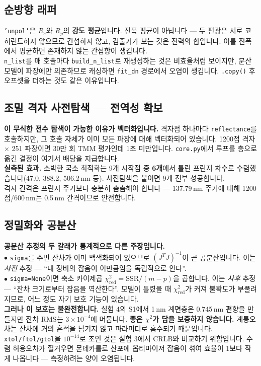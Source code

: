 \documentclass[10pt,a4paper]{article}
\newcommand{\note}[1]{%
  \begin{tcolorbox}[enhanced,breakable,colback=white,colframe=accent,
    boxrule=0pt,leftrule=1.6pt,arc=0pt,outer arc=0pt,
    left=6pt,right=2pt,top=3pt,bottom=3pt,boxsep=0pt,
    before skip=5pt, after skip=8pt]
  #1
  \end{tcolorbox}}
\begin{document}
\subsection{순방향 래퍼}

\note{
\texttt{'unpol'}은 $R_s$와 $R_p$의 \textbf{강도 평균}입니다. 진폭 평균이 아닙니다 —
두 편광은 서로 코히런트하지 않으므로 간섭하지 않고, 검출기가 보는 것은 전력의 합입니다.
이를 진폭에서 평균하면 존재하지 않는 간섭항이 생깁니다.\\[4pt]
\texttt{n\_list}를 매 호출마다 \texttt{build\_n\_list}로 재생성하는 것은 비효율처럼 보이지만,
분산 모델이 파장에만 의존하므로 캐싱하면 \texttt{fit\_dn} 경로에서 오염이 생깁니다.
\texttt{.copy()} 후 오프셋을 더하는 것도 같은 이유입니다.
}
\subsection{조밀 격자 사전탐색 — 전역성 확보}

\note{
\textbf{이 무식한 전수 탐색이 가능한 이유가 벡터화입니다.} 격자점 하나마다
\texttt{reflectance}를 호출하지만, 그 호출 자체가 이미 모든 파장에 대해 벡터화되어 있습니다.
1200점 격자 $\times$ 251 파장이면 30만 회 TMM 평가인데 1초 미만입니다.
\texttt{core.py}에서 루프를 층으로 옮긴 결정이 여기서 배당을 지급합니다.\\[4pt]
\textbf{실측된 효과.} 소박한 국소 최적화는 9개 시작점 중 \textbf{6개}에서 틀린 프린지
차수로 수렴했습니다(47.0, 388.2, 506.2\,nm 등). 사전탐색을 붙이면 9개 전부 성공합니다.\\[4pt]
격자 간격은 프린지 주기보다 충분히 촘촘해야 합니다 — 137.79\,nm 주기에 대해
1200점/600\,nm는 0.5\,nm 간격이므로 안전합니다.
}
\subsection{정밀화와 공분산}

\note{
\textbf{공분산 추정의 두 갈래가 통계적으로 다른 주장입니다.}\\[3pt]
$\bullet$ \texttt{sigma}를 주면 잔차가 이미 백색화되어 있으므로 $(J^TJ)^{-1}$이 곧
공분산입니다. 이는 \emph{사전} 추정 — ``내 장비의 잡음이 이만큼임을 독립적으로 안다''.\\[3pt]
$\bullet$ \texttt{sigma=None}이면 축소 카이제곱 $\chi^2_{\text{red}}=\text{SSR}/(m-p)$을
곱합니다. 이는 \emph{사후} 추정 — ``잔차 크기로부터 잡음을 역산한다''. 모델이 틀렸을 때
$\chi^2_{\text{red}}$가 커져 불확도가 부풀려지므로, 어느 정도 자기 보호 기능이 있습니다.\\[4pt]
\textbf{그러나 이 보호는 불완전합니다.} 실험 4의 S1에서 1\,nm 계면층은 0.745\,nm 편향을
만들지만 잔차 RMS는 $3\times10^{-4}$에 머뭅니다. \textbf{좋은 $\chi^2$가 답을 보증하지 않습니다.}
계통오차는 잔차에 거의 흔적을 남기지 않고 파라미터로 흡수되기 때문입니다.\\[4pt]
\texttt{xtol/ftol/gtol}을 $10^{-14}$로 조인 것은 실험 3에서 CRLB와 비교하기 위함입니다.
수렴 허용오차가 헐거우면 몬테카를로 산포에 옵티마이저 잡음이 섞여 효율이 1보다
작게 나옵니다 — 측정하려는 양이 오염됩니다.
}
\end{document}
